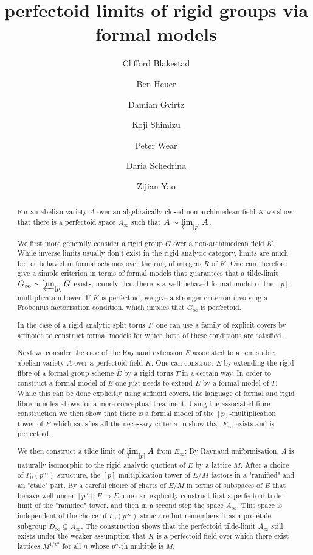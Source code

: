\documentclass[11pt,oneside]{amsart}
\title[perfectoid limits of rigid groups via formal models]{perfectoid limits of rigid groups via formal models}
\author{
	Clifford Blakestad \and
	Ben Heuer \and 
	Damian Gvirtz \and
	Koji Shimizu \and 
	Peter Wear \and
	Daria Schedrina \and
	Zijian Yao}
\theoremstyle{definition}
\theoremstyle{remark}
\begin{document}
	
	\maketitle
	
	\begin{abstract}
		For an abelian variety $A$ over an algebraically closed non-archimedean field $K$ we show that there is a perfectoid space $A_\infty$ such that $A\sim\varprojlim_{[p]}A$. 
		
		We first more generally consider a rigid group  $G$ over a non-archimedean field $K$. While inverse limits usually don't exist in the rigid analytic category, limits are much better behaved in formal schemes over the ring of integers $R$ of $K$. One can therefore give a simple criterion in terms of formal models that guarantees that a tilde-limit $G_\infty \sim\varprojlim_{[p]} G$ exists, namely that there is a well-behaved formal model of the $[p]$-multiplication tower.
		If $K$ is perfectoid, we give a stronger criterion involving a Frobenius factorisation condition, which implies that $G_\infty$ is perfectoid.
		
		In the case of a rigid analytic split torus $T$, one can use a family of explicit covers by affinoids to construct formal models for which both of these conditions are satisfied. 
		
		Next we consider the case of the Raynaud extension $E$ associated to a semistable abelian variety $A$ over a perfectoid field $K$. One can construct $E$ by extending the rigid fibre of a formal group scheme $\overline{E}$ by a rigid torus $T$ in a certain way. In order to construct a formal model of $E$ one just needs to extend $\overline{E}$ by a formal model of $T$. While this can be done explicitly using affinoid covers, the language of formal and rigid fibre bundles allows for a more conceptual treatment. Using the associated fibre construction we then show that there is a formal model of the $[p]$-multiplication tower of $E$ which satisfies all the necessary criteria to show that $E_\infty$ exists and is perfectoid.  
		
		We then construct a tilde limit of $\varprojlim_{[p]} A$ from $E_\infty$: By Raynaud uniformisation, $A$ is naturally isomorphic to the rigid analytic quotient of $E$ by a lattice $M$. After a choice of $\Gamma_0(p^\infty)$-structure, the $[p]$-multiplication tower of $E/M$ factors in a "ramified" and an "\'etale" part. By a careful choice of charts of $E/M$ in terms of subspaces of $E$ that behave well under $[p^n]:E\rightarrow E$, one can explicitly construct first a perfectoid tilde-limit of the "ramified" tower, and then in a second step the space $A_\infty$. This space is independent of the choice of $\Gamma_0(p^\infty)$-structure but remembers it as a pro-\'etale subgroup $D_\infty \subseteq A_\infty$. The construction shows that the perfectoid tilde-limit $A_\infty$ still exists under the weaker assumption that $K$ is a perfectoid field over which there exist lattices $M^{1/p^n}$ for all $n$ whose $p^n$-th multiple is $M$.
		

\end{abstract}
\end{document}
